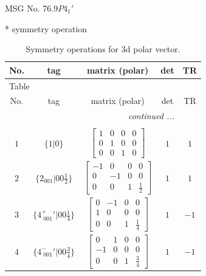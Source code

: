 \documentclass[fleqn,8pt]{jsarticle}
\begin{document}
\setcounter{MaxMatrixCols}{32}

\renewcommand{\tablename}{Table~}
\renewcommand{\figurename}{Figure~}
\begin{center}
\LARGE
MSG No. 76.9\quad$P4_{1}'$
\end{center}
* symmetry operation
\renewcommand{\arraystretch}{1.3}
\begin{longtable}{ccccc}
\caption{Symmetry operations for 3d polar vector.}
 \\
 \hline \hline
No. & tag & matrix (polar) & det & TR \\ \hline \endfirsthead

\multicolumn{4}{l}{\tablename\ \thetable{}} \\
 \hline \hline
No. & tag & matrix (polar) & det & TR \\ \hline \endhead

 \hline \hline
\multicolumn{4}{r}{\footnotesize\it continued ...} \\ \endfoot

 \hline \hline
\multicolumn{4}{r}{} \\ \endlastfoot

$ 1 $ & $ \{1|0\} $ & $ \begin{bmatrix} 1 & 0 & 0 & 0 \\ 0 & 1 & 0 & 0 \\ 0 & 0 & 1 & 0 \end{bmatrix} $ & $ 1 $ & $ 1 $ \\ \hline
$ 2 $ & $ \{2{}_{001}|0 0 \frac{1}{2}\} $ & $ \begin{bmatrix} -1 & 0 & 0 & 0 \\ 0 & -1 & 0 & 0 \\ 0 & 0 & 1 & \frac{1}{2} \end{bmatrix} $ & $ 1 $ & $ 1 $ \\ \hline
$ 3 $ & $ \{4^{+}_{\,\,001}{}'|0 0 \frac{1}{4}\} $ & $ \begin{bmatrix} 0 & -1 & 0 & 0 \\ 1 & 0 & 0 & 0 \\ 0 & 0 & 1 & \frac{1}{4} \end{bmatrix} $ & $ 1 $ & $ -1 $ \\ \hline
$ 4 $ & $ \{4^{-}_{\,\,001}{}'|0 0 \frac{3}{4}\} $ & $ \begin{bmatrix} 0 & 1 & 0 & 0 \\ -1 & 0 & 0 & 0 \\ 0 & 0 & 1 & \frac{3}{4} \end{bmatrix} $ & $ 1 $ & $ -1 $ \\
\end{longtable}
\end{document}
